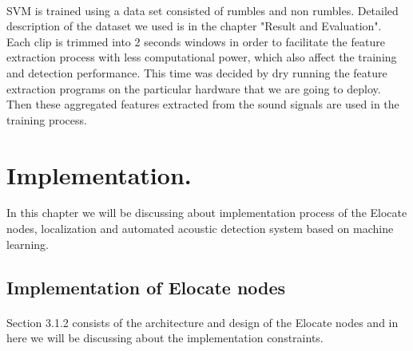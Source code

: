 \documentclass[12pt]{article}
\numberwithin{figure}{section}
\numberwithin{table}{section}
\begin{document}
\paragraph{}
SVM is trained using a data set consisted of rumbles and non rumbles. Detailed description of the dataset we used is in the chapter "Result and Evaluation". Each clip is trimmed into 2 seconds windows in order to facilitate the feature extraction process with less computational power, which also affect the training and detection performance. This time was decided by dry running the feature extraction programs on the particular hardware that we are going to deploy. Then these aggregated features extracted from the sound signals are used in the training process.



\newpage
\section{Implementation.}
In this chapter we will be discussing about implementation process of the Elocate nodes, localization and automated acoustic detection system based on machine learning.
\subsection{Implementation of Elocate nodes}
\paragraph{}
Section 3.1.2 consists of the architecture and design of the Elocate nodes and in here we will be discussing about the implementation constraints. 
\end{document}
